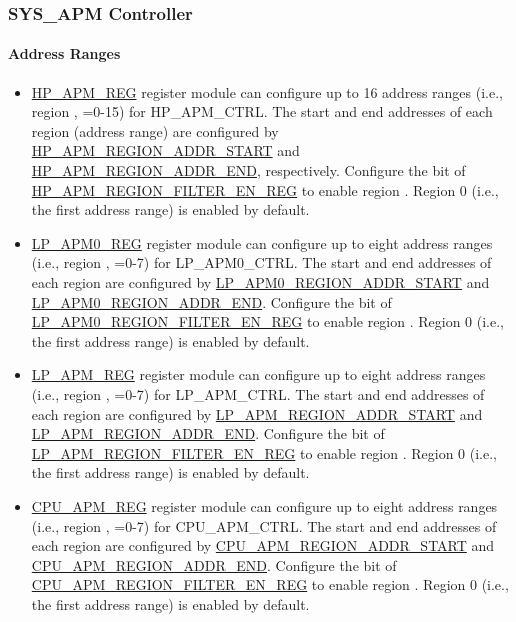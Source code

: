 \documentclass[main\_\_EN.tex]{subfiles}
\begin{document}
\subsubsection{SYS\_APM Controller}

\paragraph{Address Ranges}

\begin{itemize}
    \item \hyperref[sec:permctrl-reg-hp]{HP\_APM\_REG} register module can configure up to 16 address ranges (i.e., region , =0-15) for HP\_APM\_CTRL. The start and end addresses of each region (address range) are configured by  \hyperref[regdesc:HPAPMREGIONNADDRSTARTREG]{HP\_APM\_REGION\_ADDR\_START} and \hyperref[regdesc:HPAPMREGIONNADDRENDREG]{HP\_APM\_REGION\_ADDR\_END}, respectively. Configure the bit  of \hyperref[fielddesc:HPAPMREGIONFILTEREN]{HP\_APM\_REGION\_FILTER\_EN\_REG} to enable region . Region 0 (i.e., the first address range) is enabled by default.

    \item \hyperref[sec:permctrl-reg-lp0]{LP\_APM0\_REG} register module can configure up to eight address ranges (i.e., region , =0-7) for LP\_APM0\_CTRL. The start and end addresses of each region are configured by \hyperref[fielddesc:LPAPM0REGIONNADDRSTART]{LP\_APM0\_REGION\_ADDR\_START} and \hyperref[fielddesc:LPAPM0REGIONNADDREND]{LP\_APM0\_REGION\_ADDR\_END}. Configure the bit  of \hyperref[fielddesc:LPAPM0REGIONFILTEREN]{LP\_APM0\_REGION\_FILTER\_EN\_REG} to enable region . Region 0 (i.e., the first address range) is enabled by default.

    \item \hyperref[sec:permctrl-reg-lp]{LP\_APM\_REG} register module can configure up to eight address ranges (i.e., region , =0-7) for LP\_APM\_CTRL. The start and end addresses of each region are configured by \hyperref[fielddesc:LPAPMREGIONNADDRSTART]{LP\_APM\_REGION\_ADDR\_START} and \hyperref[fielddesc:LPAPMREGIONNADDREND]{LP\_APM\_REGION\_ADDR\_END}. Configure the bit  of \hyperref[fielddesc:LPAPMREGIONFILTEREN]{LP\_APM\_REGION\_FILTER\_EN\_REG} to enable region . Region 0 (i.e., the first address range) is enabled by default.

    \item \hyperref[sec:permctrl-reg-cpu]{CPU\_APM\_REG} register module can configure up to eight address ranges (i.e., region , =0-7) for CPU\_APM\_CTRL. The start and end addresses of each region are configured by \hyperref[fielddesc:CPUAPMREGIONNADDRSTART]{CPU\_APM\_REGION\_ADDR\_START} and \hyperref[fielddesc:CPUAPMREGIONNADDREND]{CPU\_APM\_REGION\_ADDR\_END}. Configure the bit  of \hyperref[fielddesc:CPUAPMREGIONFILTEREN]{CPU\_APM\_REGION\_FILTER\_EN\_REG} to enable region . Region 0 (i.e., the first address range) is enabled by default.
\end{itemize}
\end{document}
